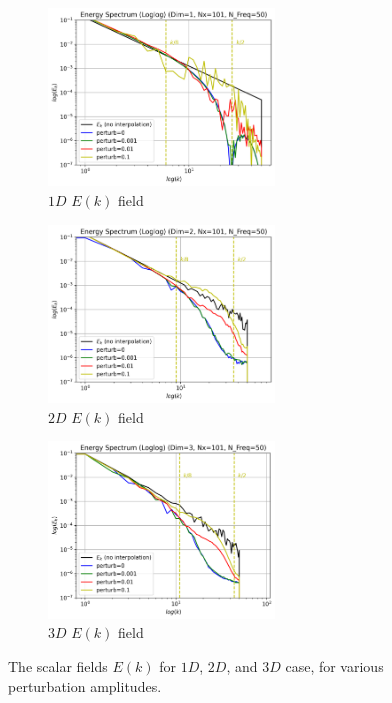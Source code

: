 \begin{figure}[H]
    \begin{subfigure}{7cm}
      \centering\includegraphics[width=6cm]{Code-Figures/sin-vel-prof-pertub/Energy Spectrum (Loglog) (Dim=1, Nx=101, N_Freq=50).png}
      \caption{$1D$ $E(k)$ field}
    \end{subfigure}
    \begin{subfigure}{7cm}
      \centering\includegraphics[width=6cm]{Code-Figures/sin-vel-prof-pertub/Energy Spectrum (Loglog) (Dim=2, Nx=101, N_Freq=50).png}
      \caption{$2D$ $E(k)$ field}
    \end{subfigure}
    \begin{subfigure}{7cm}
        \centering\includegraphics[width=6cm]{Code-Figures/sin-vel-prof-pertub/Energy Spectrum (Loglog) (Dim=3, Nx=101, N_Freq=50).png}
        \caption{$3D$ $E(k)$ field}
      \end{subfigure}
    \caption{The scalar fields $E(k)$ for $1D$, $2D$, and $3D$ case, for various perturbation amplitudes.}
    \label{fig:espec-scalar-fields-per-ampl}
\end{figure}

